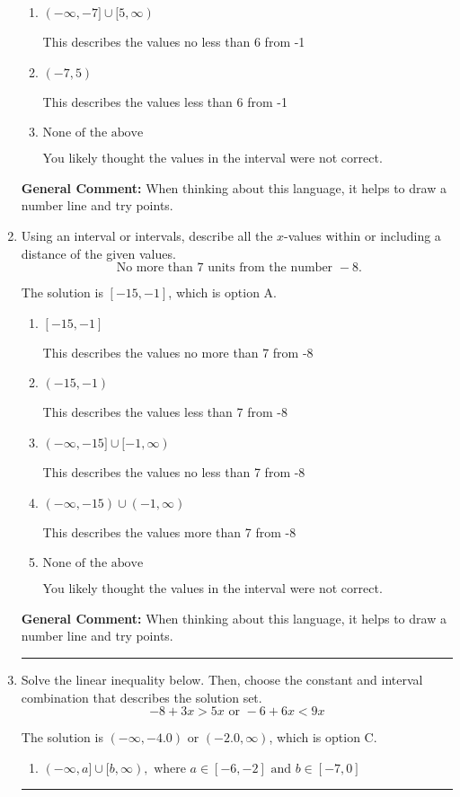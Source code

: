 \documentclass{extbook}[14pt]
\newcommand{\litem}[1]{\item #1

\rule{\textwidth}{0.4pt}}
\begin{document}
\begin{enumerate}
{\begin{enumerate}[label=\Alph*.]
This describes the values more than 6 from -1
\item \( (-\infty, -7] \cup [5, \infty) \)

This describes the values no less than 6 from -1
\item \( (-7, 5) \)

This describes the values less than 6 from -1
\item \( \text{None of the above} \)

You likely thought the values in the interval were not correct.
\end{enumerate}

\textbf{General Comment:} When thinking about this language, it helps to draw a number line and try points.
}
\litem{
Using an interval or intervals, describe all the $x$-values within or including a distance of the given values.
\[ \text{ No more than } 7 \text{ units from the number } -8. \]

The solution is \( [-15, -1] \), which is option A.\begin{enumerate}[label=\Alph*.]
\item \( [-15, -1] \)

This describes the values no more than 7 from -8
\item \( (-15, -1) \)

This describes the values less than 7 from -8
\item \( (-\infty, -15] \cup [-1, \infty) \)

This describes the values no less than 7 from -8
\item \( (-\infty, -15) \cup (-1, \infty) \)

This describes the values more than 7 from -8
\item \( \text{None of the above} \)

You likely thought the values in the interval were not correct.
\end{enumerate}

\textbf{General Comment:} When thinking about this language, it helps to draw a number line and try points.
}
\litem{
Solve the linear inequality below. Then, choose the constant and interval combination that describes the solution set.
\[ -8 + 3 x > 5 x \text{ or } -6 + 6 x < 9 x \]

The solution is \( (-\infty, -4.0) \text{ or } (-2.0, \infty) \), which is option C.\begin{enumerate}[label=\Alph*.]
\item \( (-\infty, a] \cup [b, \infty), \text{ where } a \in [-6, -2] \text{ and } b \in [-7, 0] \)


\end{enumerate}}
\end{enumerate}
\end{document}
